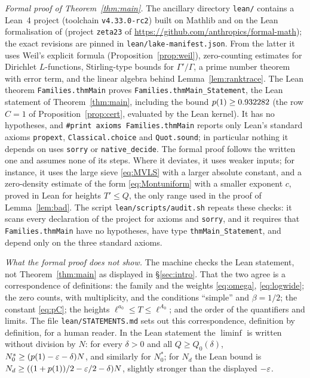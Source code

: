 \documentclass[11pt]{amsart}
\theoremstyle{definition}
\theoremstyle{remark}
\numberwithin{equation}{section}
\begin{document}
\emph{Formal proof of Theorem~\ref{thm:main}.} The ancillary directory \texttt{lean/} contains a Lean~4 project (toolchain \texttt{v4.33.0-rc2}) built on Mathlib and on the Lean formalisation of \cite{AF26} (project \texttt{zeta23} of \url{https://github.com/anthropics/formal-math}); the exact revisions are pinned in \texttt{lean/lake-manifest.json}. From the latter it uses Weil's explicit formula (Proposition~\ref{prop:weil}), zero-counting estimates for Dirichlet $L$-functions, Stirling-type bounds for $\Gamma'/\Gamma$, a prime number theorem with error term, and the linear algebra behind Lemma~\ref{lem:ranktrace}. The Lean theorem \texttt{Families.thmMain} proves \texttt{Families.thmMain\_Statement}, the Lean statement of Theorem~\ref{thm:main}, including the bound $p(1)\ge0.932282$ (the row $C=1$ of Proposition~\ref{prop:cert}, evaluated by the Lean kernel). It has no hypotheses, and \texttt{\#print axioms Families.thmMain} reports only Lean's standard axioms \texttt{propext}, \texttt{Classical.choice} and \texttt{Quot.sound}; in particular nothing it depends on uses \texttt{sorry} or \texttt{native\_decide}. The formal proof follows the written one and assumes none of its steps. Where it deviates, it uses weaker inputs; for instance, it uses the large sieve \eqref{eq:MVLS} with a larger absolute constant, and a zero-density estimate of the form \eqref{eq:Montuniform} with a smaller exponent $c$, proved in Lean for heights $T'\le Q$, the only range used in the proof of Lemma~\ref{lem:bad}. The script \texttt{lean/scripts/audit.sh} repeats these checks: it scans every declaration of the project for axioms and \texttt{sorry}, and it requires that \texttt{Families.thmMain} have no hypotheses, have type \texttt{thmMain\_Statement}, and depend only on the three standard axioms.

\emph{What the formal proof does not show.} The machine checks the Lean statement, not Theorem~\ref{thm:main} as displayed in \S\ref{sec:intro}. That the two agree is a correspondence of definitions: the family and the weights \eqref{eq:omega}, \eqref{eq:logwide}; the zero counts, with multiplicity, and the conditions ``simple'' and $\beta=1/2$; the constant \eqref{eq:pC}; the heights $\ell^{a_0}\le T\le\ell^{A_0}$; and the order of the quantifiers and limits. The file \texttt{lean/STATEMENTS.md} sets out this correspondence, definition by definition, for a human reader. In the Lean statement the $\liminf$ is written without division by $N$: for every $\delta>0$ and all $Q\ge Q_0(\delta)$, $N^s_0\ge(p(1)-\varepsilon-\delta)N$, and similarly for $N^*_0$; for $N_d$ the Lean bound is $N_d\ge((1+p(1))/2-\varepsilon/2-\delta)N$, slightly stronger than the displayed $-\varepsilon$.
\end{document}
